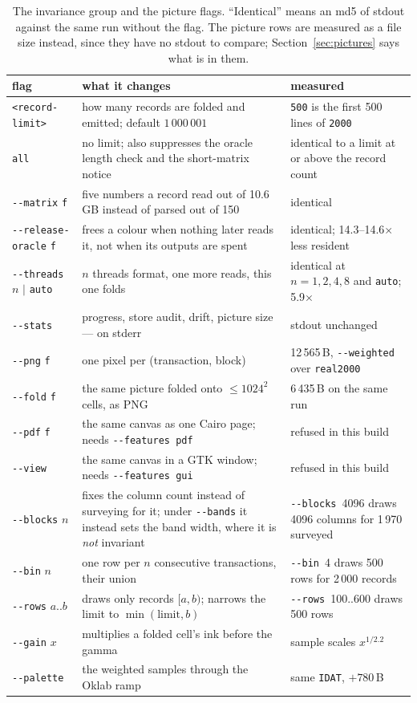 \documentclass[11pt,a4paper]{article}
\newcommand{\flag}[1]{\texttt{-{}-#1}}
\begin{document}
\begin{table}[p]
\centering\small
\begin{tabular}{p{}p{}p{}}
\toprule
flag & what it changes & measured \\
\midrule
\texttt{<record-limit>} & how many records are folded and emitted; default $1\,000\,001$ & \texttt{500} is the first 500 lines of \texttt{2000} \\
\texttt{all} & no limit; also suppresses the oracle length check and the short-matrix notice & identical to a limit at or above the record count \\
\flag{matrix} \texttt{f} & five numbers a record read out of 10.6\,GB instead of parsed out of 150 & identical \\
\flag{release-oracle} \texttt{f} & frees a colour when nothing later reads it, not when its outputs are spent & identical; 14.3--14.6$\times$ less resident \\
\flag{threads} $n$ $|$ \texttt{auto} & $n$ threads format, one more reads, this one folds & identical at $n{=}1,2,4,8$ and \texttt{auto}; 5.9$\times$ \\
\flag{stats} & progress, store audit, drift, picture size --- on stderr & stdout unchanged \\
\flag{png} \texttt{f} & one pixel per (transaction, block) & 12\,565\,B, \flag{weighted} over \texttt{real2000} \\
\flag{fold} \texttt{f} & the same picture folded onto $\le 1024^2$ cells, as PNG & 6\,435\,B on the same run \\
\flag{pdf} \texttt{f} & the same canvas as one Cairo page; needs \texttt{-{}-features pdf} & refused in this build \\
\flag{view} & the same canvas in a GTK window; needs \texttt{-{}-features gui} & refused in this build \\
\flag{blocks} $n$ & fixes the column count instead of surveying for it; under \flag{bands} it instead sets the band width, where it is \emph{not} invariant & \flag{blocks}~4096 draws 4096 columns for 1\,970 surveyed \\
\flag{bin} $n$ & one row per $n$ consecutive transactions, their union & \flag{bin}~4 draws 500 rows for 2\,000 records \\
\flag{rows} $a..b$ & draws only records $[a,b)$; narrows the limit to $\min(\text{limit},b)$ & \flag{rows}~100..600 draws 500 rows \\
\flag{gain} $x$ & multiplies a folded cell's ink before the gamma & sample scales $x^{1/2.2}$ \\
\flag{palette} & the weighted samples through the Oklab ramp & same \texttt{IDAT}, $+780$\,B \\
\bottomrule
\end{tabular}
\caption{The invariance group and the picture flags. ``Identical'' means an
md5 of stdout against the same run without the flag. The picture rows are
measured as a file size instead, since they have no stdout to compare;
Section~\ref{sec:pictures} says what is in them.}
\label{tab:invariant}
\end{table}
\end{document}
